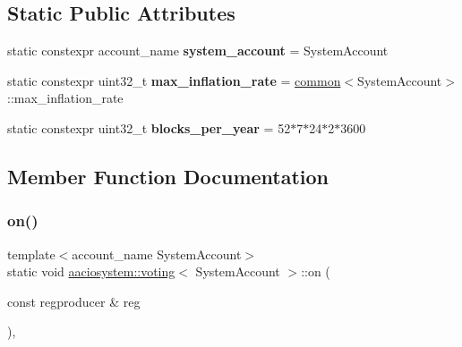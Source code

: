 \subsection*{Static Public Attributes}
\begin{DoxyCompactItemize}
\item 
\mbox{\label{classaaciosystem_1_1voting_abf0c5500b0514ed09bb878e2997a8a34}} 
static constexpr account\+\_\+name {\bfseries system\+\_\+account} = System\+Account
\item 
\mbox{\label{classaaciosystem_1_1voting_ad99bfb6b601bf55f6e8cfd93a49745ac}} 
static constexpr uint32\+\_\+t {\bfseries max\+\_\+inflation\+\_\+rate} = \mbox{\hyperlink{classaaciosystem_1_1common}{common}}$<$System\+Account$>$\+::max\+\_\+inflation\+\_\+rate
\item 
\mbox{\label{classaaciosystem_1_1voting_a58c63d5eb84ff8356a1cf34327f0e039}} 
static constexpr uint32\+\_\+t {\bfseries blocks\+\_\+per\+\_\+year} = 52$\ast$7$\ast$24$\ast$2$\ast$3600
\end{DoxyCompactItemize}


\subsection{Member Function Documentation}
\mbox{\label{classaaciosystem_1_1voting_abbefdfb92fa01d247f1f5ee366d332bc}} 
\subsubsection{\texorpdfstring{on()}{on()}\hspace{0.1cm}{\footnotesize\ttfamily [1/2]}}
{\footnotesize\ttfamily template$<$account\+\_\+name System\+Account$>$ \\
static void \mbox{\hyperlink{classaaciosystem_1_1voting}{aaciosystem\+::voting}}$<$ System\+Account $>$\+::on (\begin{DoxyParamCaption}\item[{const regproducer \&}]{reg }\end{DoxyParamCaption})\hspace{0.3cm}{\ttfamily [inline]}, {\ttfamily [static]}}


